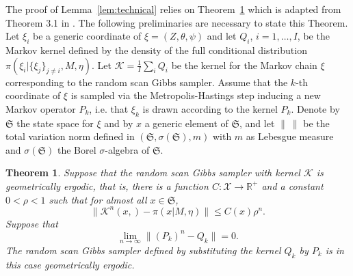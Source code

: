 \documentclass[11pt]{amsart}
\newtheorem{theorem}{Theorem}
\theoremstyle{definition}
\begin{document}
The proof of Lemma~\ref{lem:technical} relies on Theorem~\ref{th:RR}
which is adapted from Theorem 3.1 in \cite{RR07}. The following
preliminaries are necessary to state this Theorem. Let $\xi_i$ be a
generic coordinate of $\xi = (Z, \theta, \psi)$ and let $Q_i$, $i = 1,
\ldots, I$, be the Markov kernel defined by the density of the full
conditional distribution $\pi(\xi_i|\{\xi_j\}_{j\neq i}, M,
\eta)$. Let $\mathcal K = \frac{1}{I}\sum_i Q_i$ be the kernel for the
Markov chain $\xi$ corresponding to the random scan Gibbs
sampler. Assume that the $k$-th coordinate of $\xi$ is sampled via the
Metropolis-Hastings step inducing a new Markov operator $P_k$,
i.e. that $\xi_k$ is drawn according to the kernel $P_k$. Denote by
$\mathfrak S$ the state space for $\xi$ and by $x$ a generic
element of $\mathfrak S$, and let $\|\ \|$ be the total variation norm 
defined in $(\mathfrak S, \sigma(\mathfrak S), m)$ with $m$ as
Lebesgue measure and $\sigma(\mathfrak S)$ the Borel $\sigma$-algebra
of $\mathfrak S$.

\begin{theorem}\label{th:RR} Suppose that the random scan Gibbs
  sampler with kernel $\mathcal K$ is geometrically ergodic, that is,
  there is a function $C:\mathcal X \to \mathbb R^+$ and a constant $0
  < \rho < 1$ such that for almost all $x \in \mathfrak S$,
 \begin{equation}
  \label{eqn:Gibbsergodic}
  \|\mathcal K^n(x, ) - \pi(x|M, \eta)\| \leq C(x)\rho^n.
  \tag{$*$}
 \end{equation}
 Suppose that 
 \begin{equation}
  \label{eqn:MHtofullcond}
   \lim_{n\to\infty} \|(P_k)^n -  Q_k \| = 0. \tag{$**$}
 \end{equation} 
The random scan Gibbs sampler defined by substituting the kernel
$Q_k$ by $P_k$ is in this case geometrically ergodic.
\end{theorem}
\end{document}
